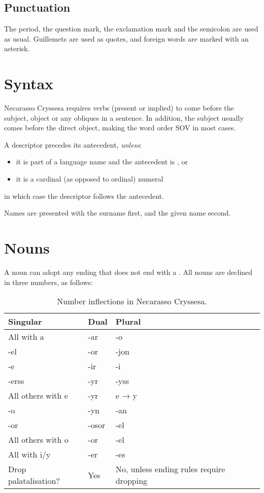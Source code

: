 \documentclass{book}
\begin{document}
\section{Punctuation}

The period, the question mark, the exclamation mark and the semicolon are used as usual. Guillemets are used as quotes, and foreign words are marked with an asterisk.

\chapter{Syntax}

Necarasso Cryssesa requires verbs (present or implied) to come before the subject, object or any obliques in a sentence. In addition, the subject usually comes before the direct object, making the word order SOV in most cases.

A descriptor precedes its antecedent, \emph{unless}:

\begin{itemize}
  \item it is part of a language name and the antecedent is , or
  \item it is a cardinal (as opposed to ordinal) numeral
\end{itemize}

in which case the descriptor follows the antecedent.

Names are presented with the surname first, and the given name second.

\chapter{Nouns}

A noun can adopt any ending that does not end with a . All nouns are declined in three numbers, as follows:

\begin{table}[h]
  \caption{Number inflections in Necarasso Cryssesa.}
  \centering
  \begin{tabu}{|X|X|X|}
    \hline
    Singular & Dual & Plural \\ \hline
    All with a & -ar & -o \\ \hline
    -el & -or & -jon \\
    -e & -ir & -i \\
    -erss & -yr & -yss \\
    All others with e & -yr & e → y \\ \hline
    -o & -yn & -an \\
    -or & -osor & -el \\
    All others with o & -or & -el \\ \hline
    All with i/y & -er & -es \\ \hline
   Drop palatalisation? & Yes & No, unless ending rules require dropping \\ \hline
  \end{tabu}
\end{table}
\end{document}
